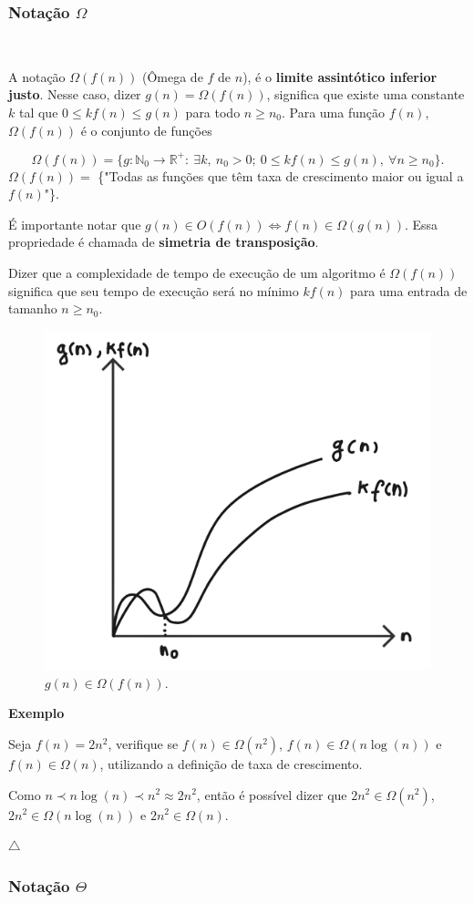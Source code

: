 \subsubsection{Notação $\Omega$}
\

A notação $\Omega(f(n))$ (Ômega de $f$ de $n$), é o \textbf{limite assintótico inferior justo}. Nesse caso, dizer $g(n)=\Omega(f(n))$, significa que existe uma constante $k$ tal que $0 \leq kf(n) \leq g(n)$ para todo $n \geq n_0$. Para uma função $f(n)$, $\Omega(f(n))$ é o conjunto de funções

\[\Omega(f(n)) = \{g: \mathbb{N}_0 \rightarrow \mathbb{R}^{+}: \ \exists k, \ n_0 > 0 ; \ 0\leq kf(n) \leq g(n), \ \forall n \geq n_0\}.\]
$\Omega(f(n))=$ \{"Todas as funções que têm taxa de crescimento maior ou igual a $f(n)$"\}.

É importante notar que $g(n)\in O(f(n)) \Leftrightarrow f(n)\in \Omega(g(n))$. Essa propriedade é chamada de \textbf{simetria de transposição}.

Dizer que a complexidade de tempo de execução de um algoritmo é $\Omega(f(n))$ significa que seu tempo de execução será no mínimo $kf(n)$ para uma entrada de tamanho $n\geq n_0$.

\begin{figure}
  \centering
  \includegraphics[width=0.4\linewidth]{img/Omega.png}
    \caption{$g(n)\in\Omega(f(n))$.}
    \label{Omega}
\end{figure}

\textbf{Exemplo}

Seja $f(n)=2n^2$, verifique se $f(n)\in\Omega(n^2)$, $f(n)\in\Omega(n\log(n))$ e $f(n)\in\Omega(n)$, utilizando a definição de taxa de crescimento.

Como $n \prec n\log(n) \prec n^2 \approx 2n^2$, então é possível dizer que $2n^2\in\Omega(n^2)$, $2n^2\in\Omega(n\log(n))$ e $2n^2\in\Omega(n)$.

{\raggedleft $\bigtriangleup$ \par}

\subsubsection{Notação $\Theta$}
\


